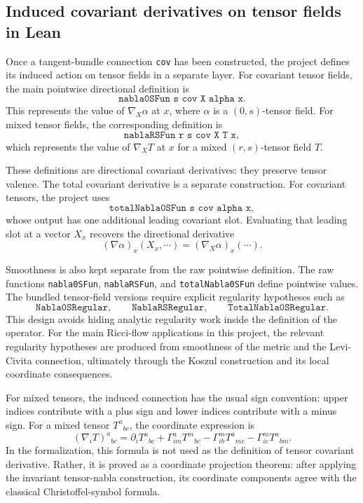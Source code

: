\documentclass[11pt]{article}
\theoremstyle{plain}
\theoremstyle{definition}
\theoremstyle{remark}
\begin{document}
\subsection{Induced covariant derivatives on tensor fields in Lean}

Once a tangent-bundle connection \texttt{cov} has been constructed, the project
defines its induced action on tensor fields in a separate layer.  For covariant
tensor fields, the main pointwise directional definition is
\[
  \texttt{nabla0SFun s cov X alpha x}.
\]
This represents the value of $\nabla_X\alpha$ at $x$, where $\alpha$ is a
$(0,s)$-tensor field.  For mixed tensor fields, the corresponding definition is
\[
  \texttt{nablaRSFun r s cov X T x},
\]
which represents the value of $\nabla_XT$ at $x$ for a mixed $(r,s)$-tensor
field $T$.

These definitions are directional covariant derivatives: they preserve tensor
valence.  The total covariant derivative is a separate construction.  For
covariant tensors, the project uses
\[
  \texttt{totalNabla0SFun s cov alpha x},
\]
whose output has one additional leading covariant slot.  Evaluating that
leading slot at a vector $X_x$ recovers the directional derivative
\[
  (\nabla\alpha)_x(X_x,\cdots) = (\nabla_X\alpha)_x(\cdots).
\]

Smoothness is also kept separate from the raw pointwise definition.  The raw
functions \texttt{nabla0SFun}, \texttt{nablaRSFun}, and
\texttt{totalNabla0SFun} define pointwise values.  The bundled tensor-field
versions require explicit regularity hypotheses such as
\[
  \texttt{Nabla0SRegular}, \qquad
  \texttt{NablaRSRegular}, \qquad
  \texttt{TotalNabla0SRegular}.
\]
This design avoids hiding analytic regularity work inside the definition of the
operator.  For the main Ricci-flow applications in this project, the relevant
regularity hypotheses are produced from smoothness of the metric and the
Levi-Civita connection, ultimately through the Koszul construction and its local
coordinate consequences.

For mixed tensors, the induced connection has the usual sign convention: upper
indices contribute with a plus sign and lower indices contribute with a minus
sign.  For a mixed tensor $T^a{}_{bc}$, the coordinate expression is
\[
  (\nabla_i T)^a{}_{bc}
  =
  \partial_i T^a{}_{bc}
  +
  \Gamma^a_{im} T^m{}_{bc}
  -
  \Gamma^m_{ib} T^a{}_{mc}
  -
  \Gamma^m_{ic} T^a{}_{bm}.
\]
In the formalization, this formula is not used as the definition of tensor
covariant derivative.  Rather, it is proved as a coordinate projection theorem:
after applying the invariant tensor-nabla construction, its coordinate
components agree with the classical Christoffel-symbol formula.
\end{document}
